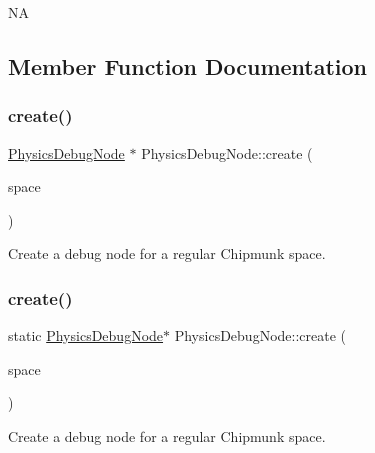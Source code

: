 NA 

\subsection{Member Function Documentation}
\mbox{\label{classPhysicsDebugNode_ad9f5a3ffb68c2eedd2514b34086aaab3}} 
\subsubsection{\texorpdfstring{create()}{create()}\hspace{0.1cm}{\footnotesize\ttfamily [1/2]}}
{\footnotesize\ttfamily \hyperlink{classPhysicsDebugNode}{Physics\+Debug\+Node} $\ast$ Physics\+Debug\+Node\+::create (\begin{DoxyParamCaption}\item[{\hyperlink{structcpSpace}{cp\+Space} $\ast$}]{space }\end{DoxyParamCaption})\hspace{0.3cm}{\ttfamily [static]}}

Create a debug node for a regular Chipmunk space. \mbox{\label{classPhysicsDebugNode_a2d8079d3eb796ab6f26e8c2c2d11e0d7}} 
\subsubsection{\texorpdfstring{create()}{create()}\hspace{0.1cm}{\footnotesize\ttfamily [2/2]}}
{\footnotesize\ttfamily static \hyperlink{classPhysicsDebugNode}{Physics\+Debug\+Node}$\ast$ Physics\+Debug\+Node\+::create (\begin{DoxyParamCaption}\item[{\hyperlink{structcpSpace}{cp\+Space} $\ast$}]{space }\end{DoxyParamCaption})\hspace{0.3cm}{\ttfamily [static]}}

Create a debug node for a regular Chipmunk space. \mbox{\label{classPhysicsDebugNode_a78fe785679cead2a155f0f767932a89f}} 
